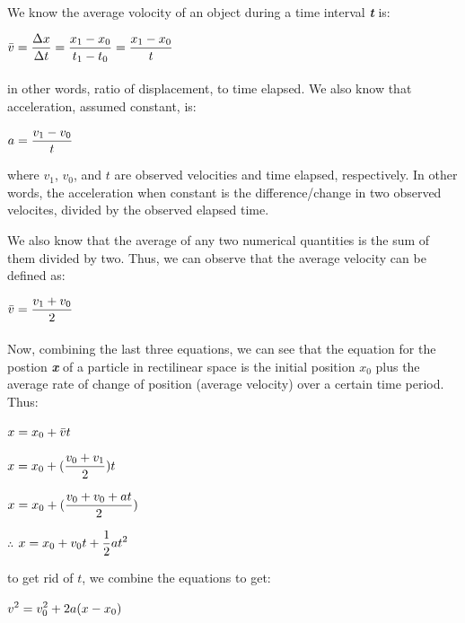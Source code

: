 \documentclass[12pt, a4paper]{article}
\begin{document}
\paragraph*{}
We know the average volocity of an object during a time interval \textbf{\textit{t}} is:

{
    \centering
    $\mathlarger{\bar v = \frac{\Delta x}{\Delta t} = \frac{x_1 - x_0}{t_1 - t_0} = \frac{x_1 - x_0}{t}}$

}
\paragraph*{}
in other words, ratio of displacement, to time elapsed. We also know that acceleration, assumed constant, is:

{
    \centering
    $ \mathlarger{a = \frac{v_1 - v_0}{t}}$

}
where $v_1$, $v_0$, and $t$ are observed velocities and time elapsed, respectively. In other words,
the acceleration when constant is the difference/change in two observed velocites, divided by the observed elapsed time.

We also know that the average of any two numerical quantities is the sum of them divided by two. Thus, we can observe that the
average velocity can be defined as:

{
    \centering
    $\mathlarger{\bar v = \frac{v_1 + v_0}{2}}$

}

\paragraph*{}
Now, combining the last three equations, we can see that the equation for the postion \textbf{\textit{x}} of a particle
in rectilinear space is the initial position $x_0$ plus the average rate of change of position (average velocity) over a certain time period.
Thus:

{
    \centering
    $\mathlarger{x = x_0 + \bar vt}$

    $\mathlarger{x = x_0 + (\frac{v_0 + v_1}{2})t}$

    $\mathlarger{x = x_0 + (\frac{v_0 + v_0 + at}{2})}$

    $\therefore$ $\mathlarger{x = x_0 + v_0t + \frac{1}{2}at^2}$

    to get rid of $t$, we combine the equations to get:

    $\mathlarger{v^2 = v_0^2 + 2a(x-x_0)}$

}
\end{document}
